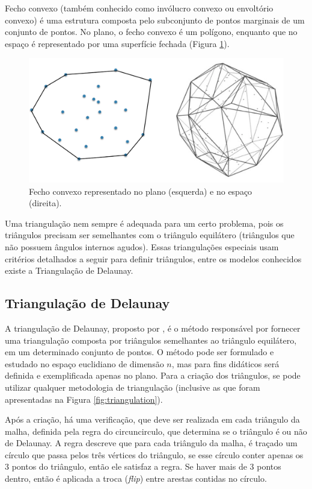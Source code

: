 Fecho convexo (também conhecido como invólucro convexo ou envoltório convexo) é uma estrutura composta pelo subconjunto de pontos marginais de um conjunto de pontos. No plano, o fecho convexo é um polígono, enquanto que no espaço é representado por uma superfície fechada (Figura \ref{fig:convex_hull}).

\begin{figure}[H]
    \centering
    \includegraphics[scale=0.4]{dados/figuras/convex_hull.png}
    \caption{Fecho convexo representado no plano (esquerda) e no espaço (direita).}
    \label{fig:convex_hull}
\end{figure}

Uma triangulação nem sempre é adequada para um certo problema, pois os triângulos precisam ser semelhantes com o triângulo equilátero (triângulos que não possuem ângulos internos agudos). Essas triangulações especiais usam critérios detalhados a seguir para definir triângulos, entre os modelos conhecidos existe a Triangulação de Delaunay.


\subsection{Triangulação de Delaunay}
\label{sec:delaunay}
A triangulação de Delaunay, proposto por \cite{delaunay1934sphere}, é o método responsável por fornecer uma triangulação composta por triângulos semelhantes ao triângulo equilátero, em um determinado conjunto de pontos. O método pode ser formulado e estudado no espaço euclidiano de dimensão $n$, mas para fins didáticos será definida e exemplificada apenas no plano.
Para a criação dos triângulos, se pode utilizar qualquer metodologia de triangulação (inclusive as que foram apresentadas na Figura \ref{fig:triangulation}).

Após a criação, há uma verificação, que deve ser realizada em cada triângulo da malha, definida pela regra do circuncirculo, que determina se o triângulo é ou não de Delaunay. 
A regra descreve que para cada triângulo da malha, é traçado um círculo que passa pelos três vértices do triângulo, se esse círculo conter apenas os 3 pontos do triângulo, então ele satisfaz a regra. 
Se haver mais de 3 pontos dentro, então é aplicada a troca (\textit{flip}) entre arestas contidas no círculo.

